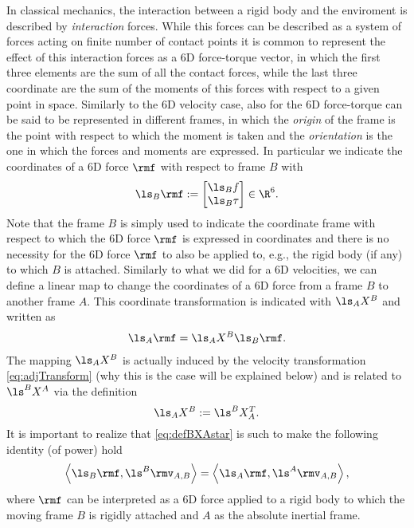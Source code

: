 In classical mechanics, the interaction between a rigid body and the enviroment is described by \emph{interaction} forces. 
While this forces can be described as a system of forces acting on finite number of contact points 
it is common to represent the effect of this interaction forces as a 6D force-torque vector, in which the first three elements are the sum of all the contact forces, while the last three coordinate are the sum of the moments of this forces with respect to a given point in space. Similarly to the 6D velocity case, also for the 6D force-torque can be said to be represented in different frames, in which the \emph{origin} of the frame is the point with respect to which the moment is taken and the \emph{orientation} is the one in which the forces and moments are expressed. In particular we indicate the coordinates of a 6D force $\rmf$ 
with respect to frame $B$ with
\begin{equation}
\ls_B\rmf := 
\begin{bmatrix}
\ls_Bf \\
\ls_B\tau
\end{bmatrix} \in \R^6. 
\end{equation}
Note that the frame $B$ is simply used to indicate the coordinate frame with respect to which the 6D force $\rmf$ is expressed in coordinates and there is no necessity for the 6D force $\rmf$ to also be applied to, e.g., the rigid body (if any) to which $B$ is attached. Similarly to what we did for a 6D velocities, we can define a linear map to change the coordinates of a 6D force from a frame $B$ to another frame $A$. This coordinate transformation is indicated with $\ls_AX^B$ and written as
\begin{align}
  \ls_A\rmf = \ls_AX^B \ls_B\rmf . 
\end{align}
The mapping $\ls_AX^B$ is actually induced by the velocity transformation \eqref{eq:adjTransform} (why this is the case will be explained below) and is related to $\ls^BX^A$ via the definition
\begin{equation} \label{eq:defBXAstar}
  \ls_AX^B := \ls^BX^T_A .
\end{equation}
It is important to realize that \eqref{eq:defBXAstar} is such to make the following identity (of power) hold
\begin{align}
\left<\ls_B \rmf, \ls^B\rmv_{A,B} \right> = 
\left<\ls_A \rmf, \ls^A\rmv_{A,B} \right> ,
\end{align}
where $\rmf$ can be interpreted as a 6D force applied to a rigid body to which the moving frame $B$ is rigidly attached and $A$ as the absolute inertial frame.
\\


